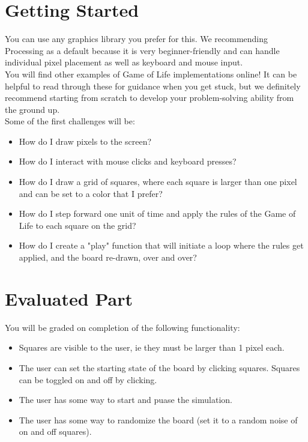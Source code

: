 \documentclass{42-en}
\begin{document}
\chapter{Getting Started}

You can use any graphics library you prefer for this. We recommending Processing as a default because it is very beginner-friendly and can handle individual pixel placement as well as keyboard and mouse input.\\

You will find other examples of Game of Life implementations online! It can be helpful to read through these for guidance when you get stuck, but we definitely recommend starting from scratch to develop your problem-solving ability from the ground up.\\

Some of the first challenges will be:
\begin{itemize}
	\item How do I draw pixels to the screen?
	\item How do I interact with mouse clicks and keyboard presses?
	\item How do I draw a grid of squares, where each square is larger than one pixel and can be set to a color that I prefer?
	\item How do I step forward one unit of time and apply the rules of the Game of Life to each square on the grid?
	\item How do I create a "play" function that will initiate a loop where the rules get applied, and the board re-drawn, over and over?
\end{itemize}


\chapter{Evaluated Part}

You will be graded on completion of the following functionality: 

\begin{itemize}
	\item Squares are visible to the user, ie they must be larger than 1 pixel each.
	\item The user can set the starting state of the board by clicking squares. Squares can be toggled on and off by clicking.
	\item The user has some way to start and puase the simulation.
	\item The user has some way to randomize the board (set it to a random noise of on and off squares). 
\end{itemize}
\end{document}

